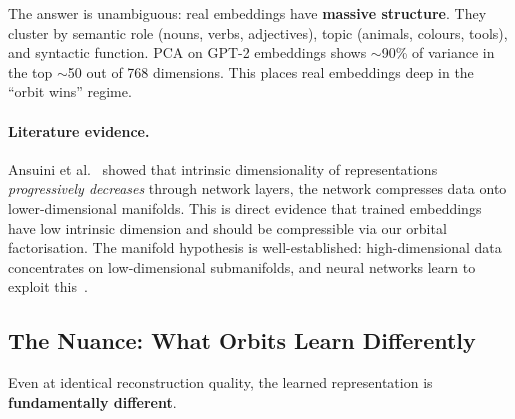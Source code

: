 \documentclass[11pt, a4paper]{article}
\theoremstyle{remark}
\begin{document}
\noindent
The answer is unambiguous: real embeddings have \textbf{massive structure}.
They cluster by semantic role (nouns, verbs, adjectives), topic (animals, colours, tools),
and syntactic function.
PCA on GPT-2 embeddings shows $\sim$90\% of variance in the top $\sim$50 out of 768 dimensions.
This places real embeddings deep in the ``orbit wins'' regime.

\paragraph{Literature evidence.}
Ansuini et al.~\cite{ansuini2019intrinsic} showed that intrinsic dimensionality of representations \emph{progressively decreases} through network layers, the network compresses data onto lower-dimensional manifolds.
This is direct evidence that trained embeddings have low intrinsic dimension and should be compressible via our orbital factorisation.
The manifold hypothesis is well-established: high-dimensional data concentrates on low-dimensional submanifolds, and neural networks learn to exploit this~\cite{bronstein2021geometric}.


\subsection{The Nuance: What Orbits Learn Differently}

Even at identical reconstruction quality, the learned representation is \textbf{fundamentally different}.
\end{document}
